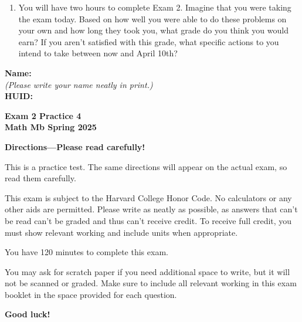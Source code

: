 \documentclass{article}
\begin{document}
{\begin{enumerate}
    \pspace{\vfill}
    
    \item You will have two hours to complete Exam 2. Imagine that you were taking the exam today. Based on how well you were able to do these problems on your own and how long they took you, what grade do you think you would earn? If you aren't satisfied with this grade, what specific actions to you intend to take between now and April 10th?

    \pspace{\vfill}

\end{enumerate}

\newpage
}

\setcounter{page}{1}

{\large \mbox{} \hfill \bf Name:\underline{\hspace{3in}}}\\[2pt]
{\mbox{} \hfill \it (Please write your name neatly in print.)}\\[12pt]
{\large \mbox{} \hfill \bf HUID:\underline{\hspace{3in}}}
 
\medskip
 
\noindent
{\large\bf
Exam 2 Practice 4\\
Math Mb Spring 2025}
\noindent


{\Large
\begin{center}\textbf{Directions---Please read carefully!} \end{center}}

This is a practice test. The same directions will appear on the actual exam, so read them carefully.

\hrulefill 


This exam is subject to the Harvard College Honor Code. No calculators or any other aids are permitted.  Please write as neatly as possible, as answers that can't be read can't be graded and thus can't receive credit. To receive full credit, you must show relevant working
and include units when appropriate. 

You have 120 minutes to complete this exam. 

You may ask for scratch paper if you need additional space to write, but it will not be scanned or graded. Make sure to include all relevant working in this exam booklet in the space provided for each question.

\begin{center}\textbf{Good luck!}\end{center}
\end{document}
